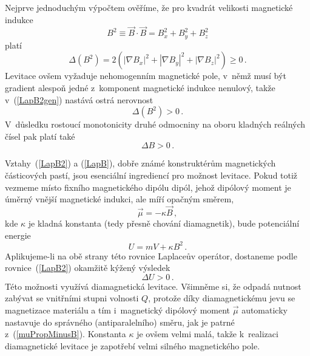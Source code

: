 Nejprve jednoduchým výpočtem ověříme, že pro kvadrát velikosti magnetické
indukce
\begin{equation}
  B^{2} \equiv \vec{B}\cdot\vec{B} = B_{x}^{2} + B_{y}^{2} + B_{z}^{2}
\end{equation}
platí~\cite{Ber-Gei:1997:EURJP:OfFlyFrogLev}
\begin{equation}
  \Delta (B^{2})
    = 2\left(\left|\nabla B_{x}\right|^{2}
           + \left|\nabla B_{y}\right|^{2}
           + \left|\nabla B_{z}\right|^{2}\right) \geq 0\,.      \label{LapB2gen}
\end{equation}
Levitace ovšem vyžaduje nehomogenním magnetické pole, v~němž musí být gradient
alespoň jedné z~komponent magnetické indukce nenulový, takže
v~(\ref{LapB2gen}) nastává ostrá nerovnost
\begin{equation}
  \Delta (B^{2}) > 0\,.                                            \label{LapB2}
\end{equation}
V~důsledku rostoucí monotonicity druhé odmocniny na oboru kladných reálných
čísel pak platí také
\begin{equation}
  \Delta B > 0\,.                                                  \label{LapB}
\end{equation}

Vztahy~(\ref{LapB2}) a (\ref{LapB}), dobře známé konstruktérům magnetických
částicových pastí, jsou esenciální ingrediencí pro možnost
levitace. Pokud totiž vezmeme místo fixního magnetického dipólu 
dipól, jehož dipólový moment je úměrný vnější magnetické indukci, ale míří
opačným směrem,
\begin{equation}
  \vec{\mu} = -\kappa\vec{B}\,,                             \label{muPropMinusB}
\end{equation}
kde $\kappa$ je kladná konstanta (tedy přesně chování diamagnetik), bude
potenciální energie
\begin{equation}
  U = mV +\kappa B^{2}\,.                                        \label{diamagU}
\end{equation}
Aplikujeme-li na obě strany této rovnice Laplaceův operátor, dostaneme
podle rovnice~(\ref{LapB2}) okamžitě kýžený výsledek
\begin{equation}
  \Delta U > 0\,.                                               \label{LapUGt0}
\end{equation}
Této možnosti využívá diamagnetická levitace. Všimněme si, že odpadá nutnost
zabývat se vnitřními stupni volnosti $Q$, protože díky diamagnetickému jevu se
magnetizace materiálu a tím i~magnetický dipólový moment $\vec{\mu}$
automaticky nastavuje do správného (antiparalelního) směru, jak je patrné
z~(\ref{muPropMinusB}). Konstanta $\kappa$ je ovšem velmi malá, takže
k~realizaci diamagnetické levitace je zapotřebí velmi silného magnetického
pole.

